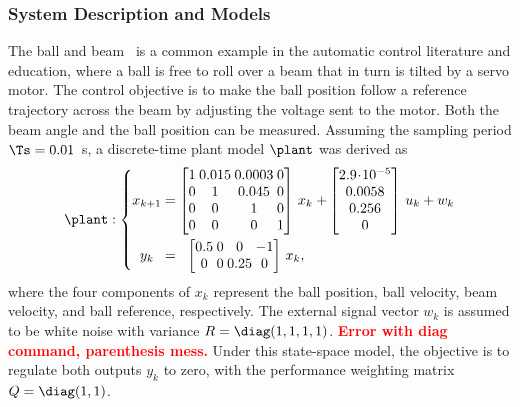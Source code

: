 \subsubsection*{System Description and Models}
The ball and beam~\cite{Wellstead:1978} is a common example in the automatic control literature and education, where a ball is free to roll over a beam that in turn is tilted by a servo motor.
The control objective is to make the ball position follow a reference trajectory across the beam by adjusting the voltage sent to the motor. Both the beam angle and the ball position can be measured.
Assuming the sampling period $\Ts = 0.01$~s, a discrete-time plant model $\plant$ was derived as
%
\begin{equation*}
\setlength\arraycolsep{1.25pt}
    \label{eq:bnb-plant}
    \plant : 
    \left\{
    \begin{matrix}
        x_{k+1} &=& 
        \begin{bmatrix}
            1 & 0.015 & 0.0003 & 0\\
            0 & 1 & 0.045 & 0\\
            0 & 0 & 1 & 0 \\
            0 & 0 & 0 & 1
        \end{bmatrix}\,x_k &+ 
        \begin{bmatrix}
            2.9\!\cdot\!10^{-5} \\
            0.0058 \\
            0.256 \\
            0
        \end{bmatrix}\,u_k + w_k \\ \vspace{-3mm} \\
        y_k &=& 
        \begin{bmatrix}
            0.5 & 0 & 0 & -1\\
            0 & 0 & 0.25 & 0
        \end{bmatrix}\,x_k, & 
    \end{matrix}
    \right.
\end{equation*}
where the four components of $x_k$ represent the ball position, ball velocity, beam velocity, and ball reference, respectively. The external signal vector $w_k$ is assumed to be white noise with variance $R = \diag(1,1,1,1)$. \textcolor{red}{\textbf{Error with diag command, parenthesis mess.}} Under this state-space model, the objective is to regulate both outputs $y_k$ to zero, with the performance weighting matrix $Q = \diag(1,1)$.


